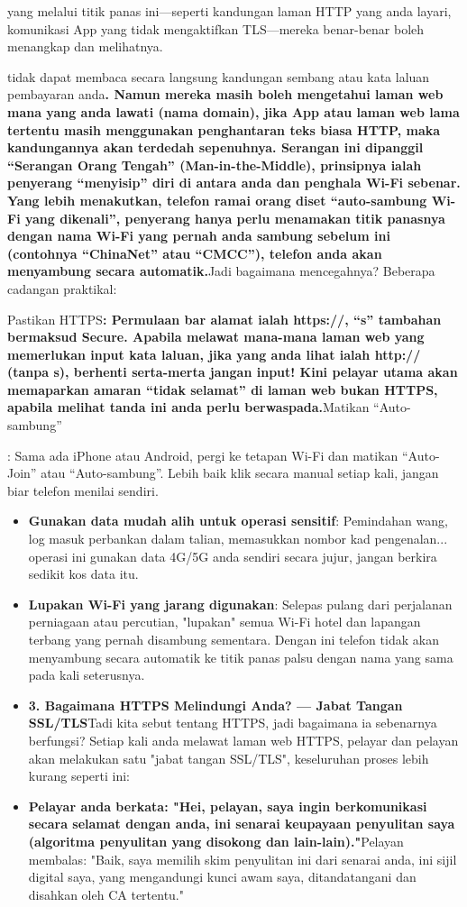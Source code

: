 yang melalui titik panas ini—seperti kandungan laman HTTP yang anda layari, komunikasi App yang tidak mengaktifkan TLS—mereka benar-benar boleh menangkap dan melihatnya.


tidak dapat membaca secara langsung kandungan sembang atau kata laluan pembayaran anda\textbf{. Namun mereka masih boleh mengetahui laman web mana yang anda lawati (nama domain), jika App atau laman web lama tertentu masih menggunakan penghantaran teks biasa HTTP, maka kandungannya akan terdedah sepenuhnya. Serangan ini dipanggil “Serangan Orang Tengah” (Man-in-the-Middle), prinsipnya ialah penyerang “menyisip” diri di antara anda dan penghala Wi-Fi sebenar. Yang lebih menakutkan, telefon ramai orang diset “auto-sambung Wi-Fi yang dikenali”, penyerang hanya perlu menamakan titik panasnya dengan nama Wi-Fi yang pernah anda sambung sebelum ini (contohnya “ChinaNet” atau “CMCC”), telefon anda akan menyambung secara automatik.}Jadi bagaimana mencegahnya? Beberapa cadangan praktikal:

Pastikan HTTPS\textbf{: Permulaan bar alamat ialah https://, “s” tambahan bermaksud Secure. Apabila melawat mana-mana laman web yang memerlukan input kata laluan, jika yang anda lihat ialah http:// (tanpa s), berhenti serta-merta jangan input! Kini pelayar utama akan memaparkan amaran “tidak selamat” di laman web bukan HTTPS, apabila melihat tanda ini anda perlu berwaspada.}Matikan “Auto-sambung”

: Sama ada iPhone atau Android, pergi ke tetapan Wi-Fi dan matikan “Auto-Join” atau “Auto-sambung”. Lebih baik klik secara manual setiap kali, jangan biar telefon menilai sendiri.

\begin{itemize}
  \item \textbf{Gunakan data mudah alih untuk operasi sensitif}: Pemindahan wang, log masuk perbankan dalam talian, memasukkan nombor kad pengenalan... operasi ini gunakan data 4G/5G anda sendiri secara jujur, jangan berkira sedikit kos data itu.
  \item \textbf{Lupakan Wi-Fi yang jarang digunakan}: Selepas pulang dari perjalanan perniagaan atau percutian, "lupakan" semua Wi-Fi hotel dan lapangan terbang yang pernah disambung sementara. Dengan ini telefon tidak akan menyambung secara automatik ke titik panas palsu dengan nama yang sama pada kali seterusnya.
  \item \textbf{3. Bagaimana HTTPS Melindungi Anda? — Jabat Tangan SSL/TLS}Tadi kita sebut tentang HTTPS, jadi bagaimana ia sebenarnya berfungsi? Setiap kali anda melawat laman web HTTPS, pelayar dan pelayan akan melakukan satu "jabat tangan SSL/TLS", keseluruhan proses lebih kurang seperti ini:
  \item \textbf{Pelayar anda berkata: "Hei, pelayan, saya ingin berkomunikasi secara selamat dengan anda, ini senarai keupayaan penyulitan saya (algoritma penyulitan yang disokong dan lain-lain)."}Pelayan membalas: "Baik, saya memilih skim penyulitan ini dari senarai anda, ini sijil digital saya, yang mengandungi kunci awam saya, ditandatangani dan disahkan oleh CA tertentu."
\end{itemize}

